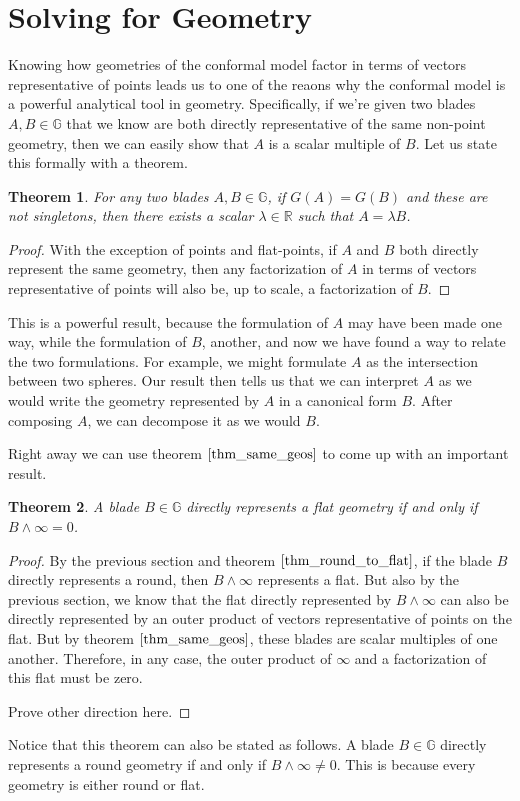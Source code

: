 \documentclass[12pt]{article}
\newcommand{\G}{\mathbb{G}}
\newcommand{\R}{\mathbb{R}}
\newcommand{\nvai}{\infty}
\newtheorem{theorem}{Theorem}[section]
\begin{document}
\section{Solving for Geometry}

Knowing how geometries of the conformal model factor in terms of vectors
representative of points leads us to one of the reaons why the conformal model
is a powerful analytical tool in geometry.  Specifically, if we're given two blades $A,B\in\G$ that
we know are both directly representative of the same non-point geometry, then we can easily show
that $A$ is a scalar multiple of $B$.  Let us state this formally with a theorem.
\begin{theorem}\label{thm_same_geos}
For any two blades $A,B\in\G$, if $G(A)=G(B)$ and these are not singletons,
then there exists a scalar $\lambda\in\R$ such that $A=\lambda B$.
\end{theorem}
\begin{proof}
With the exception of points and flat-points,
if $A$ and $B$ both directly represent the same geometry,
then any factorization of $A$ in terms of vectors representative of points will
also be, up to scale, a factorization of $B$.
\end{proof}
This is a powerful result, because the formulation
of $A$ may have been made one way, while the formulation of $B$, another, and now
we have found a way to relate the two formulations.  For example,
we might formulate $A$ as the intersection between two spheres.  Our result then tells us
that we can interpret $A$ as we would write the geometry represented by $A$ in a
canonical form $B$.  After composing $A$, we can decompose it as we would $B$.

Right away we can use theorem $\eqref{thm_same_geos}$ to come up with an important result.
\begin{theorem}\label{thm_flat_xor_round}
A blade $B\in\G$ directly represents a flat geometry if and only if
$B\wedge\nvai=0$.
\end{theorem}
\begin{proof}
By the previous section and theorem $\eqref{thm_round_to_flat}$, if the blade $B$ directly represents a round,
then $B\wedge\nvai$ represents a flat.  But also by the previous section, we know that the
flat directly represented by $B\wedge\nvai$ can also be directly represented by an outer
product of vectors representative of points on the flat.  But by theorem $\eqref{thm_same_geos}$, these blades
are scalar multiples of one another.  Therefore, in any case, the outer product of $\nvai$
and a factorization of this flat must be zero.

Prove other direction here.
\end{proof}
Notice that this theorem can also be stated as follows.  A blade $B\in\G$
directly represents a round geometry if and only if $B\wedge\nvai\neq 0$.
This is because every geometry is either round or flat.
\end{document}
